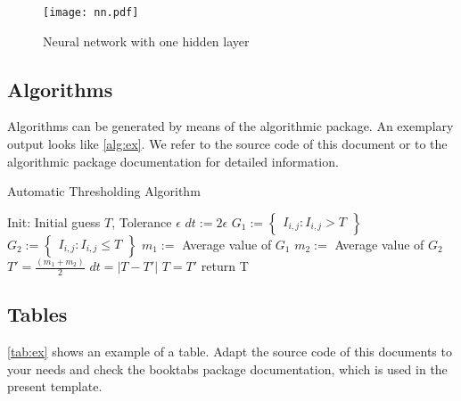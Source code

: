 \begin{figure}
	\centering
	\texttt{[image: nn.pdf]}
	\caption{Neural network with one hidden layer}
	\label{fig:ex}
\end{figure}

\subsection{Algorithms}
Algorithms can be generated by means of the algorithmic package. An exemplary output looks like \autoref{alg:ex}. We refer to the source code of this document or to the algorithmic package documentation for detailed information.


\begin{algorithm}\caption{Automatic Thresholding Algorithm}\label{alg:ex}
	\begin{algorithmic}
	\STATE Init: Initial guess $T$, Tolerance $\epsilon$
	\STATE $dt := 2\epsilon$
		\STATE $G_1 := \begin{Bmatrix} I_{i,j}: I_{i,j} > T \end{Bmatrix}$
		\STATE $G_2 := \begin{Bmatrix} I_{i,j}: I_{i,j} \leq T \end{Bmatrix}$
		\STATE $m_1 :=$ Average value of $G_1$
		\STATE $m_2 :=$ Average value of $G_2$
		\STATE $T' = \frac{(m_1 + m_2)}{2}$
		\STATE $dt = \lvert T - T' \rvert$
		\STATE $T = T'$
	\ENDWHILE
	\STATE return T
	\end{algorithmic}
\end{algorithm}

\subsection{Tables}
\autoref{tab:ex} shows an example of a table. Adapt the source code of this documents to your needs and check the booktabs package documentation, which is used in the present template.

